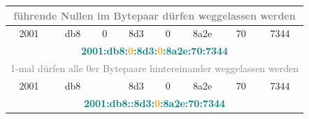 \begin{frame}[fragile]
\begin{tiny}
\begin{center}
\begin{tabular}{|c|c|c|c|c|c|c|c|c|c|c|c|c|c|c|c|}
    \hline
    \hline
    \multicolumn{16}{|c|}{\textcolor{gray}{führende Nullen im Bytepaar dürfen weggelassen werden}} \\
    \hline
    \multicolumn{2}{|c|}{2001} & \multicolumn{2}{c|}{db8} &
      \multicolumn{2}{c|}{0} & \multicolumn{2}{c|}{8d3} &
        \multicolumn{2}{c|}{0} & \multicolumn{2}{c|}{8a2e} &
          \multicolumn{2}{c|}{70} & \multicolumn{2}{c|}{7344} \\
    \hline
    \multicolumn{16}{|c|}{\textcolor{teal}{\small{\textbf{2001:db8:\textcolor{orange}{0}:8d3:\textcolor{orange}{0}:8a2e:70:7344}}}} \\
    \hline
    \hline
    \multicolumn{16}{|c|}{\textcolor{gray}{1-mal dürfen alle 0er Bytepaare hintereinander weggelassen werden}} \\
    \hline
    \multicolumn{2}{|c|}{2001} & \multicolumn{2}{c|}{db8} &
      \multicolumn{2}{c|}{} & \multicolumn{2}{c|}{8d3} &
        \multicolumn{2}{c|}{0} & \multicolumn{2}{c|}{8a2e} &
          \multicolumn{2}{c|}{70} & \multicolumn{2}{c|}{7344} \\
    \hline
    \multicolumn{16}{|c|}{\textcolor{teal}{\normalsize{\textbf{2001:db8::8d3:\textcolor{orange}{0}:8a2e:70:7344}}}} \\
   
    \hline
    \hline
  \end{tabular}
\end{center}
\end{tiny}
\end{frame}

